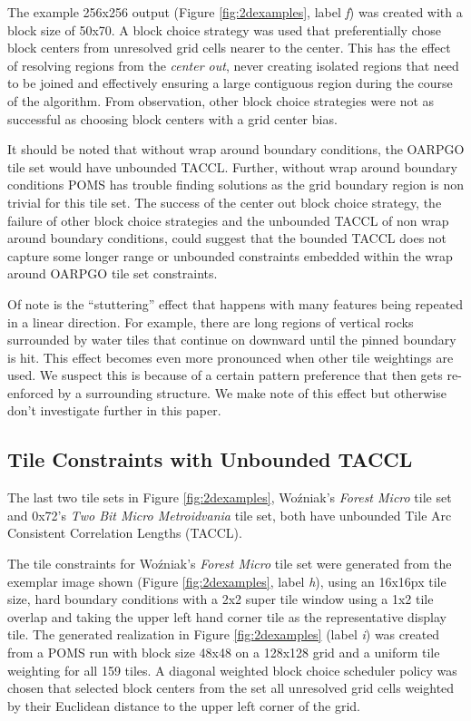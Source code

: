 The example 256x256 output (Figure \ref{fig:2dexamples}, label \textit{f})
was created with a block size of 50x70.
A block choice strategy was used that preferentially chose block centers from unresolved grid cells
nearer to the center.
This has the effect of resolving regions from the \textit{center out}, never creating isolated regions that need to be joined and effectively
  ensuring a large contiguous region during the course of the algorithm.
From observation, other block choice strategies were not as successful as choosing block centers with a grid center bias.

It should be noted that without wrap around boundary conditions, the OARPGO tile set would have unbounded TACCL.
Further, without wrap around boundary conditions POMS has trouble finding solutions as the
grid boundary region is non trivial for this tile set.
The success of the center out block choice strategy, the failure of other block choice strategies and the unbounded TACCL of
non wrap around boundary conditions, could suggest that the bounded TACCL does not capture some longer range or unbounded constraints
  embedded within the wrap around OARPGO tile set constraints.

Of note is the ``stuttering'' effect that happens with many features being repeated in a linear direction.
For example, there are long regions of vertical rocks surrounded by water tiles that continue on downward until the
pinned boundary is hit.
This effect becomes even more pronounced when other tile weightings are used.
We suspect this is because of a certain pattern preference that then gets re-enforced
by a surrounding structure.
We make note of this effect but otherwise don't investigate further in this paper.

\subsection{Tile Constraints with Unbounded TACCL}

The last two tile sets in Figure \ref{fig:2dexamples}, Wo\'zniak's \textit{Forest Micro} tile set and 0x72's \textit{Two Bit Micro Metroidvania} tile set,
both have unbounded Tile Arc Consistent Correlation Lengths (TACCL).

The tile constraints for Wo\'zniak's \textit{Forest Micro} tile set were generated from the exemplar image shown (Figure \ref{fig:2dexamples}, label \textit{h}), using
an 16x16px tile size, hard boundary conditions with a 2x2 super tile window using a 1x2 tile overlap and taking the upper left hand corner tile as the representative
display tile.
The generated realization in Figure \ref{fig:2dexamples} (label \textit{i}) was created from a POMS run with block size 48x48 on a 128x128 grid
and a uniform tile weighting for all 159 tiles.
A diagonal weighted block choice scheduler policy was chosen that selected block centers from the set all unresolved grid cells weighted by their Euclidean distance
to the upper left corner of the grid.

